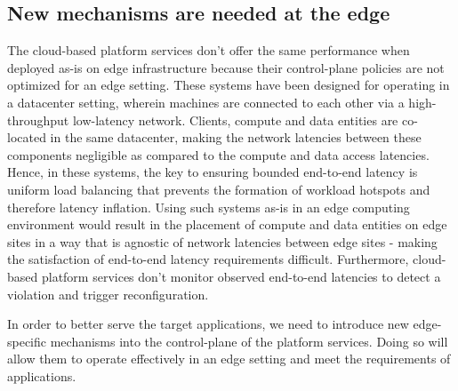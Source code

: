 \subsection{New mechanisms are needed at the edge}
The cloud-based platform services don't offer the same performance when deployed as-is on edge infrastructure because their control-plane policies are not optimized for an edge setting. These systems have been designed for operating in a datacenter setting, wherein machines are connected to each other via a high-throughput low-latency network. Clients, compute and data entities are co-located in the same datacenter, making the network latencies between these components negligible as compared to the compute and data access latencies. Hence, in these systems, the key to ensuring bounded end-to-end latency is uniform load balancing that prevents the formation of workload hotspots and therefore latency inflation. Using such systems as-is in an edge computing environment would result in the placement of compute and data entities on edge sites in a way that is agnostic of network latencies between edge sites - making the satisfaction of end-to-end latency requirements difficult. Furthermore, cloud-based platform services don't monitor observed end-to-end latencies to detect a violation and trigger reconfiguration.
\par In order to better serve the target applications, we need to introduce new edge-specific mechanisms into the control-plane of the platform services. Doing so will allow them to operate effectively in an edge setting and meet the requirements of applications.